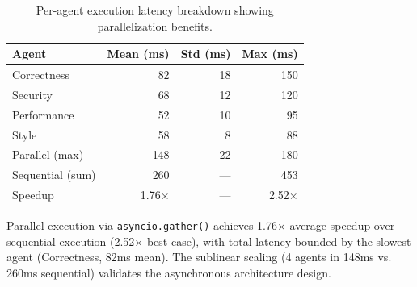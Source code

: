 \documentclass[10pt,twocolumn]{article}
\begin{document}
\begin{table}[h]
\centering
\caption{Per-agent execution latency breakdown showing parallelization benefits.}
\label{tab:timing}
\small
\begin{tabular}{@{}lrrr@{}}
\toprule
\textbf{Agent} & \textbf{Mean (ms)} & \textbf{Std (ms)} & \textbf{Max (ms)} \\
\midrule
Correctness & 82 & 18 & 150 \\
Security & 68 & 12 & 120 \\
Performance & 52 & 10 & 95 \\
Style & 58 & 8 & 88 \\
\midrule
Parallel (max) & 148 & 22 & 180 \\
Sequential (sum) & 260 & --- & 453 \\
\midrule
Speedup & 1.76$\times$ & --- & 2.52$\times$ \\
\bottomrule
\end{tabular}
\end{table}

Parallel execution via \texttt{asyncio.gather()} achieves 1.76$\times$ average speedup over sequential execution (2.52$\times$ best case), with total latency bounded by the slowest agent (Correctness, 82ms mean). The sublinear scaling (4 agents in 148ms vs. 260ms sequential) validates the asynchronous architecture design.
\end{document}
